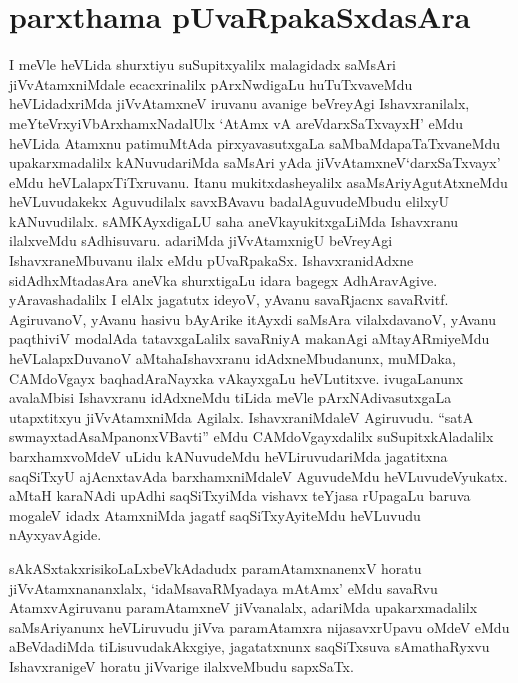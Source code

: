 \section*{parxthama pUvaRpakaSxdasAra}

\begin{artha}
I meVle heVLida shurxtiyu suSupitxyalilx malagidadx saMsAri
jiVvAtamxniMdale ecacxrinalilx pArxNwdigaLu huTuTxvaveMdu
heVLidadxriMda jiVvAtamxneV iruvanu avanige beVreyAgi Ishavxranilalx,
meYteVrxyiVbArxhamxNadalUlx `AtAmx vA areVdarxSaTxvayxH' eMdu heVLida
Atamxnu patimuMtAda pirxyavasutxgaLa saMbaMdapaTaTxvaneMdu
upakarxmadalilx kANuvudariMda saMsAri yAda jiVvAtamxneV`darxSaTxvayx'
eMdu heVLalapxTiTxruvanu. Itanu mukitxdasheyalilx
asaMsAriyAgutAtxneMdu heVLuvudakekx Aguvudilalx savxBAvavu
badalAguvudeMbudu elilxyU kANuvudilalx. sAMKAyxdigaLU saha
aneVkayukitxgaLiMda Ishavxranu ilalxveMdu sAdhisuvaru. adariMda
jiVvAtamxnigU beVreyAgi IshavxraneMbuvanu ilalx eMdu
pUvaRpakaSx. IshavxranidAdxne sidAdhxMtadasAra aneVka shurxtigaLu
idara bagegx  AdhAravAgive. yAravashadalilx I elAlx jagatutx ideyoV,
yAvanu savaRjacnx savaRvitf. AgiruvanoV, yAvanu hasivu bAyArike
itAyxdi saMsAra vilalxdavanoV, yAvanu paqthiviV modalAda
tatavxgaLalilx savaRniyA makanAgi aMtayARmiyeMdu heVLalapxDuvanoV
aMtahaIshavxranu idAdxneMbudanunx, muMDaka, CAMdoVgayx baqhadAraNayxka
vAkayxgaLu heVLutitxve. ivugaLanunx avalaMbisi Ishavxranu idAdxneMdu
tiLida meVle pArxNAdivasutxgaLa utapxtitxyu jiVvAtamxniMda
Agilalx. IshavxraniMdaleV Agiruvudu. ``satA
swmayxtadAsaMpanonxVBavti'' eMdu CAMdoVgayxdalilx suSupitxkAladalilx
barxhamxvoMdeV uLidu kANuvudeMdu heVLiruvudariMda jagatitxna saqSiTxyU
ajAcnxtavAda barxhamxniMdaleV AguvudeMdu heVLuvudeVyukatx. aMtaH
karaNAdi upAdhi saqSiTxyiMda vishavx teYjasa rUpagaLu baruva mogaleV
idadx AtamxniMda jagatf saqSiTxyAyiteMdu heVLuvudu nAyxyavAgide.
\end{artha}


\begin{artha}
sAkASxtakxrisikoLaLxbeVkAdadudx paramAtamxnanenxV horatu
jiVvAtamxnananxlalx, `idaMsavaRMyadaya mAtAmx' eMdu savaRvu
AtamxvAgiruvanu paramAtamxneV jiVvanalalx, adariMda upakarxmadalilx
saMsAriyanunx heVLiruvudu jiVva paramAtamxra nijasavxrUpavu oMdeV eMdu
aBeVdadiMda tiLisuvudakAkxgiye, jagatatxnunx saqSiTxsuva sAmathaRyxvu
IshavxranigeV horatu jiVvarige ilalxveMbudu sapxSaTx.
\end{artha}



